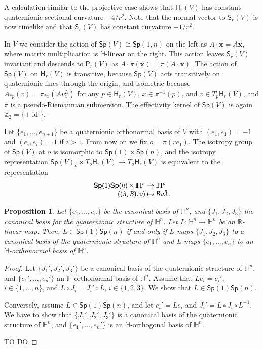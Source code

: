 \documentclass[12pt, a4paper]{amsart}
\newcommand{\id}{\operatorname{id}}
\newcommand{\R}{\mathbb{R}}
\renewcommand{\H}{\mathbb{H}}
\newcommand{\Sp}{\mathsf{Sp}}
\newtheorem{proposition}[theorem]{Proposition}
\theoremstyle{remark}
\begin{document}
A calculation similar to the projective case shows that $\mathsf{H}_r(V)$ has constant quaternionic sectional curvature $-4/r^2$. 
Note that the normal vector to $\mathsf{S}_r(V)$ is now timelike and that $\mathsf{S}_r(V)$ has constant curvature $-1/r^2$.
\medskip

In $V$ we consider the action of $\Sp(V)\cong\Sp(1,n)$ on the left as
$A\cdot\mathbf{x}=A\mathbf{x}$, where matrix multiplication is $\H$-linear on the right.
This action leaves $\mathsf{S}_r(V)$ invariant and descends to $\mathsf{P}_r(V)$ as $A\cdot\pi(\mathbf{x})=\pi(A\cdot\mathbf{x})$.
The action of $\Sp(V)$ on $\mathsf{H}_r(V)$ is transitive, because $\Sp(V)$ acts transitively on quaternionic lines through the origin, and isometric because
$A_{*p}(v)=\pi_{*x}(Av_x^L)$ for any $p\in\mathsf{H}_r(V)$, $x\in\pi^{-1}(p)$, and $v\in T_p\mathsf{H}_r(V)$, and $\pi$ is a pseudo-Riemannian submersion.
The effectivity kernel of $\Sp(V)$ is again $\mathbb{Z}_2=\{\pm \id\}$.

Let $\{e_1,\dots,e_{n+1}\}$ be a quaternionic orthonormal basis of $V$ with $(e_1,e_1)=-1$ and $(e_i,e_i)=1$ if $i>1$.
From now on we fix $o=\pi(re_1)$.
The isotropy group of $\Sp(V)$ at $o$ is isomorphic to $\Sp(1)\times\Sp(n)$, 
and the isotropy representation $\Sp(V)_o\times T_o\mathsf{H}_r(V)\to T_o\mathsf{H}_r(V)$
is equivalent to the representation
\[
\begin{array}{r@{\ }c@{\ }l}
\Sp(1)\Sp(n)\times\H^n & \to & \H^n\\
((\lambda,B),v) & \mapsto & Bv\bar{\lambda}.
\end{array}
\]

\begin{proposition}
Let $\{e_1,\dots,e_n\}$ be the canonical basis of $\H^n$, and $\{J_1,J_2,J_3\}$ the canonical basis for the quaternionic structure of $\H^n$.
Let $L\colon\H^n\to\H^n$ be an $\R$-linear map.
Then, $L\in\Sp(1)\Sp(n)$ if and only if $L$ maps $\{J_1,J_2,J_3\}$ to a canonical basis of the quaternionic structure of $\H^n$ and $L$ maps $\{e_1,\dots,e_n\}$ to an $\H$-orthonormal basis of $\H^n$.
\end{proposition}

\begin{proof}
Let $\{J_1',J_2',J_3'\}$ be a canonical basis of the quaternionic structure of $\H^n$, and $\{e_1',\dots,e_n'\}$ an $\H$-orthonormal basis of $\H^n$.
Assume that $Le_i=e_i'$, $i\in\{1,\dots,n\}$, and $L\circ J_i=J_i'\circ L$, $i\in\{1,2,3\}$.
We show that $L\in\Sp(1)\Sp(n)$.

Conversely, assume $L\in\Sp(1)\Sp(n)$, and let $e_i'=Le_i$ and $J_i'=L\circ J_i\circ L^{-1}$.
We have to show that $\{J_1',J_2',J_3'\}$ is a canonical basis of the quaternionic structure of $\H^n$, and $\{e_1',\dots,e_n'\}$ is an $\H$-orthogonal basis of $\H^n$.

TO DO
\end{proof}
\end{document}
